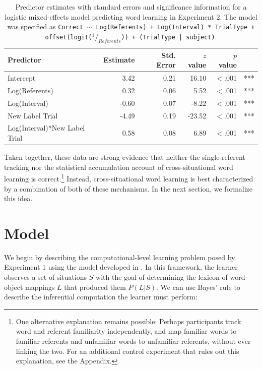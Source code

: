 \documentclass[authoryear,review]{elsarticle}
\begin{document}
\begin{table}[tb]
\begin{center}
\begin{tabular}{lrrrrl}
 Predictor & Estimate & Std. Error & $z$ value & $p$ value &  \\ 
  \hline
  Intercept & 3.42 & 0.21 & 16.10 & $<$.001 & *** \\ 
  Log(Referents) & 0.32 & 0.06 & 5.52 & $<$.001 & *** \\ 
  Log(Interval) & -0.60 & 0.07 & -8.22 & $<$.001 & *** \\ 
  New Label Trial & -4.49 & 0.19 & -23.52 & $<$.001 & *** \\ 
  Log(Interval)*New Label Trial & 0.58 & 0.08 & 6.89 & $<$.001 & *** \\ 
   \hline
\end{tabular}
\end{center}
\caption{\label{tab:exp2_reg}Predictor estimates with standard errors and significance information for a logistic mixed-effects model predicting word learning in Experiment 2. The model was specified as {\tt{Correct $\sim$ Log(Referents) + Log(Interval) * TrialType + offset(logit($^1/_{Referents}$)) + (TrialType | subject)}}.}
\end{table}

Taken together, these data are strong evidence that neither the single-referent tracking nor the statistical accumulation account of cross-situational word learning is correct.\footnote{One alternative explanation remains possible: Perhaps participants track word and referent familiarity independently, and map familiar words to familiar referents and unfamiliar words to unfamiliar referents, without ever linking the two. For an additional control experiment that rules out this explanation, see the Appendix.} Instead, cross-situational word learning is best characterized by a combination of both of these mechanisms. In the next section, we formalize this idea.

\section{Model}

We begin by describing the computational-level learning problem posed by Experiment 1 using the model developed in \citet{Frank2009a}. In this framework, the learner observes a set of situations $S$ with the goal of determining the lexicon of word-object mappings $L$ that produced them $P(L|S)$. We can use Bayes' rule to describe the inferential computation the learner must perform: 
\end{document}
